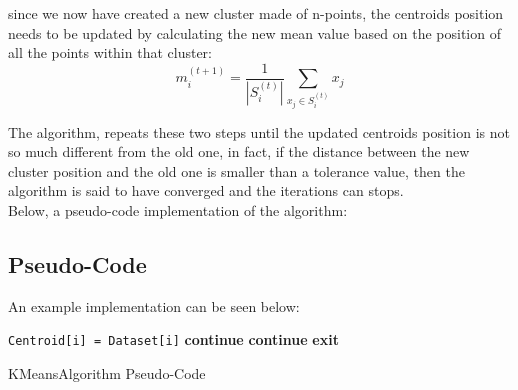 \documentclass[10pt,twocolumn,letterpaper]{article}
\begin{document}
since we now have created a new cluster made of n-points, the centroids position needs to be updated by calculating the new mean value 
based on the position of all the points within that cluster:\newline
\begin{equation}
\label{eq:first}
m^{(t+1)}_i = \frac{1}{\left|S^{(t)}_i\right|} \sum_{x_j \in S^{(t)}_i} x_j 
\end{equation}  

The algorithm, repeats these two steps until the updated centroids position is not so much different from the old one, in fact, if the 
distance between the new cluster position and the old one is smaller than a tolerance value, then the algorithm is said to 
have converged and the iterations can stops.
\\
Below, a pseudo-code implementation of the algorithm:\\
\subsection{Pseudo-Code}
An example implementation can be seen below:
\begin{algorithm}
\begin{algorithmic}[1]
        \State \texttt{Centroid[i] = Dataset[i]}
    \EndFor
        			\EndIf
    			\EndFor
    		\EndFor
    					\State \textbf{continue}
        			\EndIf
    			\EndFor
    				\State \textbf{continue}
        		\EndIf
    		\EndFor
    			\State \textbf{exit}
        	\EndIf
    \EndWhile
\EndProcedure
\end{algorithmic}
\caption{KMeansAlgorithm Pseudo-Code}
\end{algorithm}
\newpage
\end{document}
